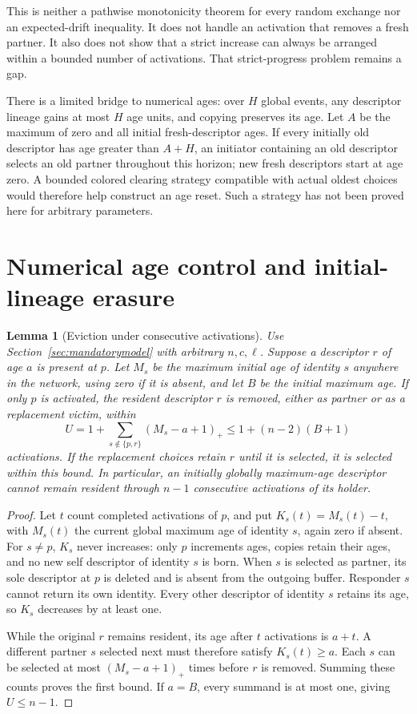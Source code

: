 \documentclass[11pt]{article}
\newtheorem{lemma}[theorem]{Lemma}
\begin{document}
This is neither a pathwise monotonicity theorem for every random
exchange nor an expected-drift inequality. It does not handle an
activation that removes a fresh partner. It also does not show that
a strict increase can always be arranged within a bounded number
of activations. That strict-progress problem remains a gap.

There is a limited bridge to numerical ages: over $H$ global events,
any descriptor lineage gains at most $H$ age units, and copying
preserves its age. Let $A$ be the maximum of zero and all initial
fresh-descriptor ages. If every initially old descriptor has age
greater than $A+H$, an initiator containing
an old descriptor selects an old partner throughout this horizon;
new fresh descriptors start at age zero. A bounded colored
clearing strategy compatible with actual oldest choices would
therefore help construct an age reset. Such a strategy has not
been proved here for arbitrary parameters.

\section{Numerical age control and initial-lineage erasure}
\label{sec:lineages}

\begin{lemma}[Eviction under consecutive activations]
\label{lem:forcing}
Use Section~\ref{sec:mandatorymodel} with arbitrary $n,c,\ell$.
Suppose a descriptor $r$ of age $a$ is present at $p$.
Let $M_s$ be the maximum initial age of identity $s$ anywhere in
the network, using zero if it is absent, and let $B$ be the
initial maximum age. If only $p$ is activated, the resident
descriptor $r$ is removed, either as partner or as a replacement
victim, within
\[
 U=1+\sum_{s\notin\{p,r\}}(M_s-a+1)_+
 \le1+(n-2)(B+1)
\]
activations. If the replacement choices retain $r$ until it is
selected, it is selected within this bound. In particular, an
initially globally maximum-age descriptor cannot remain resident
through $n-1$ consecutive activations of its holder.
\end{lemma}
\begin{proof}
Let $t$ count completed activations of $p$, and put
$K_s(t)=M_s(t)-t$, with $M_s(t)$ the current global maximum
age of identity $s$, again zero if absent. For $s\ne p$,
$K_s$ never increases: only $p$ increments ages, copies retain
their ages, and no new self descriptor of identity $s$ is born.
When $s$ is selected as partner, its sole descriptor at $p$ is
deleted and is absent from the outgoing buffer. Responder $s$
cannot return its own identity. Every other descriptor of identity
$s$ retains its age, so $K_s$ decreases by at least one.

While the original $r$ remains resident, its age after $t$
activations is $a+t$. A different partner $s$ selected next must
therefore satisfy $K_s(t)\ge a$. Each $s$ can be selected at most
$(M_s-a+1)_+$ times before $r$ is removed. Summing these counts
proves the first bound. If $a=B$, every summand is at most one,
giving $U\le n-1$.
\end{proof}
\end{document}
